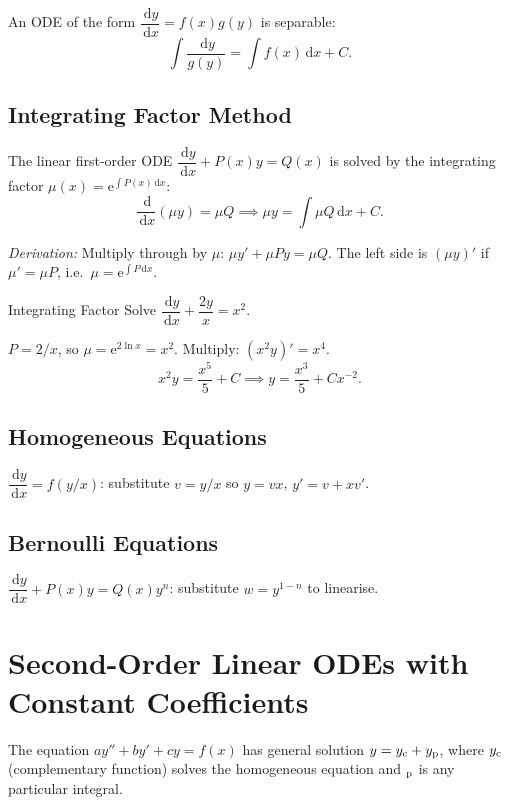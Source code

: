 \documentclass[12pt, a4paper]{book}
\newcommand{\dd}{\,\mathrm{d}}
\newcommand{\dx}{\,\mathrm{d}x}
\newcommand{\e}{\mathrm{e}}
\begin{document}
An ODE of the form $\displaystyle \dfrac{\dd y}{\dx}=f(x)g(y)$ is separable:
\[
\int\frac{\dd y}{g(y)}=\int f(x)\dx+C.
\]

\subsection{Integrating Factor Method}

The linear first-order ODE $\displaystyle \dfrac{\dd y}{\dx}+P(x)y=Q(x)$ is solved by the integrating factor $\displaystyle \mu(x)=\e^{\int P(x)\dx}$:
\[
\frac{\dd}{\dx}(\mu y)=\mu Q \implies \mu y = \int\mu Q\dx + C.
\]

\textit{Derivation:} Multiply through by $\displaystyle \mu$: $\displaystyle \mu y'+\mu Py=\mu Q$. The left side is $\displaystyle (\mu y)'$ if $\displaystyle \mu'=\mu P$, i.e.\ $\displaystyle \mu=\e^{\int P\dx}$.

\begin{example}{Integrating Factor}{}
Solve $\displaystyle \dfrac{\dd y}{\dx}+\dfrac{2y}{x}=x^2$.

$\displaystyle P=2/x$, so $\displaystyle \mu=\e^{2\ln x}=x^2$. Multiply: $\displaystyle (x^2 y)'=x^4$.
\[
x^2 y = \frac{x^5}{5}+C \implies y=\frac{x^3}{5}+Cx^{-2}.
\]
\end{example}

\subsection{Homogeneous Equations}

$\displaystyle \dfrac{\dd y}{\dx}=f(y/x)$: substitute $v=y/x$ so $y=vx$, $y'=v+xv'$.

\subsection{Bernoulli Equations}

$\displaystyle \dfrac{\dd y}{\dx}+P(x)y=Q(x)y^n$: substitute $w=y^{1-n}$ to linearise.

\section{Second-Order Linear ODEs with Constant Coefficients}

The equation $\displaystyle ay''+by'+cy=f(x)$ has general solution $\displaystyle y=y_{\rm c}+y_{\rm p}$, where $\displaystyle y_{\rm c}$ (complementary function) solves the homogeneous equation and $\displaystyle _{\rm p}$ is any particular integral.
\end{document}
